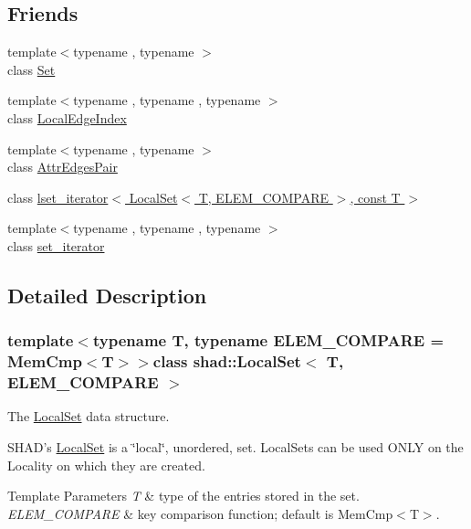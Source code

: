 \subsection*{Friends}
\begin{DoxyCompactItemize}
\item 
{\footnotesize template$<$typename , typename $>$ }\\class \hyperlink{classshad_1_1LocalSet_abe8ae75525fd5b29f58e1b5537b92ba1}{Set}
\item 
{\footnotesize template$<$typename , typename , typename $>$ }\\class \hyperlink{classshad_1_1LocalSet_afc8d107f39c9ea0b8848ea970eb36b93}{Local\-Edge\-Index}
\item 
{\footnotesize template$<$typename , typename $>$ }\\class \hyperlink{classshad_1_1LocalSet_af9dbb4ffd51a4c29389ab2f892cd5e82}{Attr\-Edges\-Pair}
\item 
class \hyperlink{classshad_1_1LocalSet_a7fa8272788381da5a3b8cadef548a77f}{lset\-\_\-iterator$<$ Local\-Set$<$ T, E\-L\-E\-M\-\_\-\-C\-O\-M\-P\-A\-R\-E $>$, const T $>$}
\item 
{\footnotesize template$<$typename , typename , typename $>$ }\\class \hyperlink{classshad_1_1LocalSet_a51032913d89093f66aa9219f72afe821}{set\-\_\-iterator}
\end{DoxyCompactItemize}


\subsection{Detailed Description}
\subsubsection*{template$<$typename T, typename E\-L\-E\-M\-\_\-\-C\-O\-M\-P\-A\-R\-E = Mem\-Cmp$<$\-T$>$$>$class shad\-::\-Local\-Set$<$ T, E\-L\-E\-M\-\_\-\-C\-O\-M\-P\-A\-R\-E $>$}

The \hyperlink{classshad_1_1LocalSet}{Local\-Set} data structure. 

S\-H\-A\-D's \hyperlink{classshad_1_1LocalSet}{Local\-Set} is a \char`\"{}local\char`\"{}, unordered, set. Local\-Sets can be used O\-N\-L\-Y on the Locality on which they are created. 
\begin{DoxyTemplParams}{Template Parameters}
{\em T} & type of the entries stored in the set. \\
\hline
{\em E\-L\-E\-M\-\_\-\-C\-O\-M\-P\-A\-R\-E} & key comparison function; default is Mem\-Cmp$<$\-T$>$. \\
\hline
\end{DoxyTemplParams}


